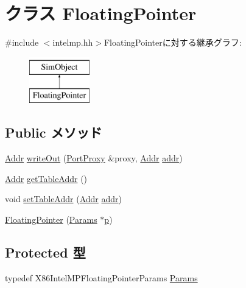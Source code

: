 \hypertarget{classX86ISA_1_1IntelMP_1_1FloatingPointer}{
\section{クラス FloatingPointer}
\label{classX86ISA_1_1IntelMP_1_1FloatingPointer}
}


{\ttfamily \#include $<$intelmp.hh$>$}FloatingPointerに対する継承グラフ:\begin{figure}[H]
\begin{center}
\leavevmode
\includegraphics[height=2cm]{classX86ISA_1_1IntelMP_1_1FloatingPointer}
\end{center}
\end{figure}
\subsection*{Public メソッド}
\begin{DoxyCompactItemize}
\item 
\hyperlink{base_2types_8hh_af1bb03d6a4ee096394a6749f0a169232}{Addr} \hyperlink{classX86ISA_1_1IntelMP_1_1FloatingPointer_ad41fd44625bfa1495c2d729037dbf863}{writeOut} (\hyperlink{classPortProxy}{PortProxy} \&proxy, \hyperlink{base_2types_8hh_af1bb03d6a4ee096394a6749f0a169232}{Addr} \hyperlink{namespaceX86ISA_ab705917f60c5566f9ce56a93f798b2e2}{addr})
\item 
\hyperlink{base_2types_8hh_af1bb03d6a4ee096394a6749f0a169232}{Addr} \hyperlink{classX86ISA_1_1IntelMP_1_1FloatingPointer_ad2b5276c95bbec6102bd1b9f1eb8ea26}{getTableAddr} ()
\item 
void \hyperlink{classX86ISA_1_1IntelMP_1_1FloatingPointer_aeaa306e0b92006f1478facf62f5d93d9}{setTableAddr} (\hyperlink{base_2types_8hh_af1bb03d6a4ee096394a6749f0a169232}{Addr} \hyperlink{namespaceX86ISA_ab705917f60c5566f9ce56a93f798b2e2}{addr})
\item 
\hyperlink{classX86ISA_1_1IntelMP_1_1FloatingPointer_ad1eac1c8c7bc3ba0624ff9018b113597}{FloatingPointer} (\hyperlink{classX86ISA_1_1IntelMP_1_1FloatingPointer_a9b05acb2e1b9f8b2b6d52a542fe703ef}{Params} $\ast$\hyperlink{namespaceX86ISA_af675c1d542a25b96e11164b80809a856}{p})
\end{DoxyCompactItemize}
\subsection*{Protected 型}
\begin{DoxyCompactItemize}
\item 
typedef X86IntelMPFloatingPointerParams \hyperlink{classX86ISA_1_1IntelMP_1_1FloatingPointer_a9b05acb2e1b9f8b2b6d52a542fe703ef}{Params}
\end{DoxyCompactItemize}
